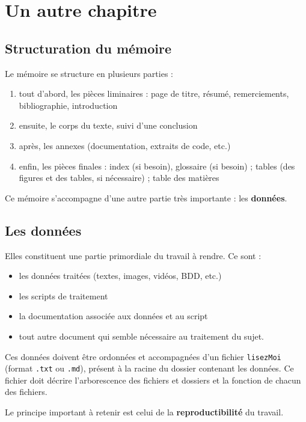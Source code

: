 \documentclass[a4paper,12pt,twoside]{book}
\begin{document}
	\chapter{Un autre chapitre}
	
	\section{Structuration du mémoire}
	
	Le mémoire se structure en plusieurs parties :
	\begin{enumerate}
		\item tout d'abord, les pièces liminaires : page de titre, résumé, remerciements, bibliographie, introduction
		\item ensuite, le corps du texte, suivi d'une conclusion
		\item après, les annexes (documentation, extraits de code, etc.)
		\item enfin, les pièces finales : index (si besoin), glossaire (si besoin) ; tables (des figures et des tables, si nécessaire) ; table des matières
	\end{enumerate}
	
	Ce mémoire s'accompagne d'une autre partie très importante : les \textbf{données}.
	
	\section{Les données}
	
	Elles constituent une partie primordiale du travail à rendre. Ce sont :
	\begin{itemize}
		\item les données traitées (textes, images, vidéos, BDD, etc.)
		\item les scripts de traitement
		\item la documentation associée aux données et au script
		\item tout autre document qui semble nécessaire au traitement du sujet.
	\end{itemize}
	
	Ces données doivent être ordonnées et accompagnées d'un fichier \texttt{lisezMoi} (format \texttt{.txt} ou \texttt{.md}), présent à la racine du dossier contenant les données. Ce fichier doit décrire l'arborescence des fichiers et dossiers et la fonction de chacun des fichiers.
	
	Le principe important à retenir est celui de la \textbf{reproductibilité} du travail.
	
\end{document}

